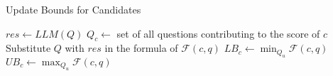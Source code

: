 \begin{algorithm}
\caption{Update Bounds for Candidates}
\begin{algorithmic}[1]
\State \( res \leftarrow LLM(Q) \)
    \State \( Q_c \leftarrow \) set of all questions contributing to the score of \( c \)
        \State Substitute \( Q \) with \( res \) in the formula of \( \mathcal{F}(c, q) \)
        \State \( LB_c \gets \min_{Q_u} \mathcal{F}(c, q) \)
        \State \( UB_c \gets \max_{Q_u} \mathcal{F}(c, q) \)
    \EndIf
\EndFor
\end{algorithmic}
\end{algorithm}

\begin{comment}
   \begin{algorithm}
\caption{Update Bounds for Candidates}
\begin{algorithmic}[1]
\State \( res \leftarrow LLM(Q) \)
\For{each candidate \( c \in C \)}
    \State \( Q_c \leftarrow \) set of all questions contributing to the score of c
    \If{\( Q \in Q_c \)} 
        \If{scoring function is based on sum}
            \State \( LB_c \gets LB_c + res \) 
            \State \( UB_c \gets UB_c - (MAX\_SCORE - res) \)
        \ElsIf{scoring function is based on average}
            \State \( n \gets \text{len}(Q_c) \)
            \State \( LB_c \gets LB_c + \frac{res}{n} \) 
            \State \( UB_c \gets UB_c - \frac{MAX\_SCORE - res}{n} \)
        \EndIf
    \EndIf
\EndFor
\end{algorithmic}
\end{algorithm} 
\end{comment}



